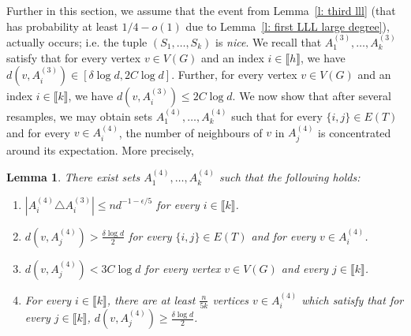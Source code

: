 \documentclass[notitlepage]{scrartcl}
\newcommand{\br}[1]{\llbracket{#1}\rrbracket}
\newtheorem{lemma}[thm]{Lemma}
\begin{document}
Further in this section, we assume that the event from Lemma~\ref{l: third lll} (that has probability at least $1/4-o(1)$ due to Lemma~\ref{l: first LLL large degree}), actually occurs; i.e. the tuple $(S_1,\ldots,S_k)$ is \emph{nice}. We recall that $A_1^{(3)},\ldots, A_k^{(3)}$ satisfy that for every vertex $v \in V(G)$ and an index $i \in \br{h}$, we have $d(v, A_i^{(3)}) \in [\delta \log d, 2C \log d]$. Further, for every vertex $v \in V(G)$ and an index $i\in \br{k}$, we have $d(v, A_i^{(3)}) \le 2C \log d$. We now show that after several resamples, we may obtain sets $A_1^{(4)}, \ldots, A_k^{(4)}$ such that for every $\{i, j\} \in E(T)$ and for every $v \in A_i^{(4)}$, the number of neighbours of $v$ in $A_j^{(4)}$ is concentrated around its expectation. More precisely, 
\begin{lemma}\label{l: no b}
There exist sets $A_1^{(4)}, \dots, A_k^{(4)}$ such that the following holds:
    \begin{enumerate}
        \item $\left|A_i^{(4)}\triangle A_i^{(3)}\right|\le nd^{-1-\epsilon/5}$ for every $i\in \br{k}$.\label{l: no b item}
        \item $d(v, A_j^{(4)}) > \frac{\delta \log d}{2}$ for every $\{i,j\} \in E(T)$ and for every $v \in A_i^{(4)}$.
        \item $d(v, A_j^{(4)}) < 3C \log d$ for every vertex $v \in V(G)$ and every $j \in \br{k}$.
        \item For every $i\in \br{k}$, there are at least $\frac{n}{5k}$ vertices $v\in A_i^{(4)}$ which satisfy that for every $j\in \br{k}$, $d(v,A_j^{(4)})\ge \frac{\delta\log d}{2}$. 
    \end{enumerate}
\end{lemma}
\end{document}
